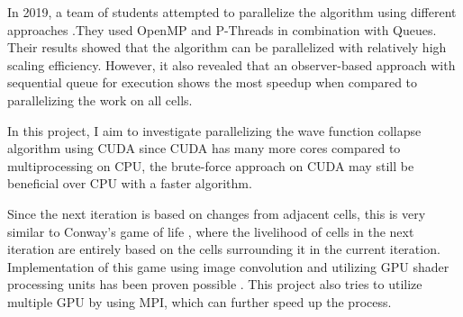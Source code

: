 In 2019, a team of students attempted to parallelize the algorithm using different approaches \cite{JanAmy2019}.They used OpenMP and P-Threads in combination with Queues. Their results showed that the algorithm can be parallelized with relatively high scaling efficiency. However, it also revealed that an observer-based approach with sequential queue for execution shows the most speedup when compared to parallelizing the work on all cells. 

In this project, I aim to investigate parallelizing the wave function collapse algorithm using CUDA since CUDA has many more cores compared to multiprocessing on CPU, the brute-force approach on CUDA may still be beneficial over CPU with a faster algorithm.

Since the next iteration is based on changes from adjacent cells, this is very similar to Conway's game of life \cite{games1970fantastic}, where the livelihood of cells in the next iteration are entirely based on the cells surrounding it in the current iteration. Implementation of this game using image convolution and utilizing GPU shader processing units has been proven possible \cite{nicholasrui_2017}. This project also tries to utilize multiple GPU by using MPI, which can further speed up the process. 